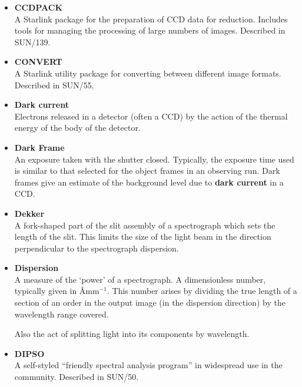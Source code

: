\documentclass[twoside,11pt]{article}
\newcommand{\htmlref}[2]{#1}
\newcommand{\xref}[3]{#1}
\begin{document}
\begin{itemize}
\item {\bf\label{gl_ccdpack}CCDPACK}\\
      A Starlink package for the preparation of CCD data for reduction.
      Includes tools for managing the processing of large numbers of
      images.  Described in \xref{SUN/139}{sun139}{}.

\item {\bf\label{gl_convert}CONVERT}\\
      A Starlink utility package for converting between different image
      formats.  Described in \xref{SUN/55}{sun55}{}.

\item {\bf\label{gl_dark_currrent}Dark current}\\
      Electrons released in a detector (often a CCD) by the action of
      the thermal energy of the body of the detector.

\item {\bf\label{gl_dark_frame}Dark Frame}\\
      An exposure taken with the shutter closed.  Typically, the
      exposure time used is similar to that selected for the object
      frames in an observing run.  Dark frames give an estimate of
      the background level due to \htmlref{{\bf dark current}}{gl_dark_current}
      in a CCD.

\item {\bf\label{gl_dekker}Dekker}\\
      A fork-shaped part of the slit assembly of a spectrograph which
      sets the length of the slit.  This limits the size of the light
      beam in the direction perpendicular to the spectrograph dispersion.

\item {\bf\label{gl_dispersion}Dispersion}\\
      A measure of the `power' of a spectrograph. A dimensionless number,
      typically given in \AA mm${}^{-1}$.  This number arises by dividing
      the true
      length of a section of an order in the output image (in the
      dispersion direction) by the wavelength range covered.

      Also the act of splitting light into its components by wavelength.

\item {\bf\label{gl_dipso}DIPSO}\\
      A self-styled ``friendly spectral analysis program'' in
      widespread use in the community.  Described in
      \xref{SUN/50}{sun50}{}.


\end{itemize}
\end{document}
